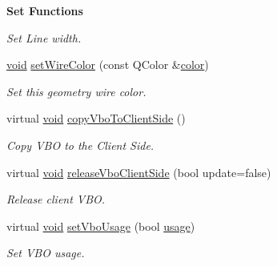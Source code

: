 \begin{Indent}{\bf Set Functions}
\begin{DoxyCompactItemize}
\begin{DoxyCompactList}\small\item\em Set Line width. \end{DoxyCompactList}\item 
\hyperlink{group___u_a_v_objects_plugin_ga444cf2ff3f0ecbe028adce838d373f5c}{void} \hyperlink{class_g_l_c___geometry_a87f69c6f6d0cbdcdeedf581af64a4143}{set\-Wire\-Color} (const Q\-Color \&\hyperlink{glext_8h_a3ea846f998d64f079b86052b6c4193a8}{color})
\begin{DoxyCompactList}\small\item\em Set this geometry wire color. \end{DoxyCompactList}\item 
virtual \hyperlink{group___u_a_v_objects_plugin_ga444cf2ff3f0ecbe028adce838d373f5c}{void} \hyperlink{class_g_l_c___geometry_a85f7c7cdfd6b9ad14f0a67a33e7b994f}{copy\-Vbo\-To\-Client\-Side} ()
\begin{DoxyCompactList}\small\item\em Copy V\-B\-O to the Client Side. \end{DoxyCompactList}\item 
virtual \hyperlink{group___u_a_v_objects_plugin_ga444cf2ff3f0ecbe028adce838d373f5c}{void} \hyperlink{class_g_l_c___geometry_a5bea1aedcfa7b03b05b7b345d3bfb70b}{release\-Vbo\-Client\-Side} (bool update=false)
\begin{DoxyCompactList}\small\item\em Release client V\-B\-O. \end{DoxyCompactList}\item 
virtual \hyperlink{group___u_a_v_objects_plugin_ga444cf2ff3f0ecbe028adce838d373f5c}{void} \hyperlink{class_g_l_c___geometry_a23e7976fd3b4a098cb0886bd72eaad33}{set\-Vbo\-Usage} (bool \hyperlink{glext_8h_ae759ed0394ed5353d8bef2fb755305da}{usage})
\begin{DoxyCompactList}\small\item\em Set V\-B\-O usage. \end{DoxyCompactList}\end{DoxyCompactItemize}
\end{Indent}
